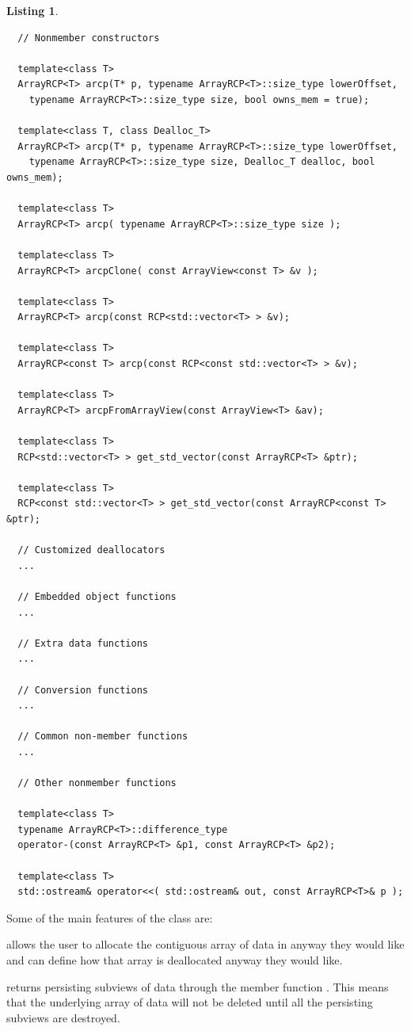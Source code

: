\documentclass[pdf,ps2pdf,11pt]{SANDreport}
\newtheorem{listing}{Listing}
\begin{document}
\begin{listing}
{\begin{verbatim}
  // Nonmember constructors
  
  template<class T>
  ArrayRCP<T> arcp(T* p, typename ArrayRCP<T>::size_type lowerOffset,
    typename ArrayRCP<T>::size_type size, bool owns_mem = true);
  
  template<class T, class Dealloc_T>
  ArrayRCP<T> arcp(T* p, typename ArrayRCP<T>::size_type lowerOffset,
    typename ArrayRCP<T>::size_type size, Dealloc_T dealloc, bool owns_mem);
  
  template<class T>
  ArrayRCP<T> arcp( typename ArrayRCP<T>::size_type size );
  
  template<class T>
  ArrayRCP<T> arcpClone( const ArrayView<const T> &v );
  
  template<class T>
  ArrayRCP<T> arcp(const RCP<std::vector<T> > &v);
  
  template<class T>
  ArrayRCP<const T> arcp(const RCP<const std::vector<T> > &v);
  
  template<class T>
  ArrayRCP<T> arcpFromArrayView(const ArrayView<T> &av);
  
  template<class T>
  RCP<std::vector<T> > get_std_vector(const ArrayRCP<T> &ptr);
  
  template<class T>
  RCP<const std::vector<T> > get_std_vector(const ArrayRCP<const T> &ptr);

  // Customized deallocators
  ...

  // Embedded object functions
  ...

  // Extra data functions
  ...

  // Conversion functions
  ...

  // Common non-member functions
  ...

  // Other nonmember functions
  
  template<class T>
  typename ArrayRCP<T>::difference_type
  operator-(const ArrayRCP<T> &p1, const ArrayRCP<T> &p2);
  
  template<class T>
  std::ostream& operator<<( std::ostream& out, const ArrayRCP<T>& p );
\end{verbatim}}
\end{listing}

Some of the main features of the {} class are:

{} allows the user to allocate the contiguous array of data in
anyway they would like and can define how that array is deallocated anyway
they would like.

{} returns persisting subviews of data through the
member function {}.  This means that the
underlying array of data will not be deleted until all the persisting
subviews are destroyed.
\end{document}

